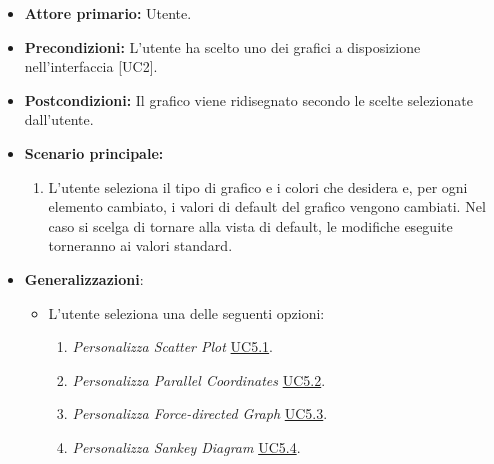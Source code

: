 \begin{itemize}
	\item \textbf{Attore primario:} Utente.
	\item \textbf{Precondizioni:} L'utente ha scelto uno dei grafici a disposizione nell'interfaccia [UC2].
	\item \textbf{Postcondizioni:} Il grafico viene ridisegnato secondo le scelte selezionate dall'utente.
	\item \textbf{Scenario principale:}
	\begin{enumerate}
    		\item L'utente seleziona il tipo di grafico e i colori che desidera e, per ogni elemento cambiato, i valori di default del grafico
    vengono cambiati. Nel caso si scelga di tornare alla vista di default, le modifiche eseguite torneranno ai valori standard.
    \end{enumerate}
    \item \textbf{Generalizzazioni}:
    \begin{itemize}
        \item L'utente seleziona una delle seguenti opzioni:
                \begin{enumerate}
                    \item \textit{Personalizza Scatter Plot} \hyperref[sec:UC5.1]{UC5.1}.
                    \item \textit{Personalizza Parallel Coordinates} \hyperref[sec:UC5.2]{UC5.2}.
                    \item \textit{Personalizza Force-directed Graph} \hyperref[sec:UC5.3]{UC5.3}.
                    \item \textit{Personalizza Sankey Diagram} \hyperref[sec:UC5.4]{UC5.4}.
                \end{enumerate}
    \end{itemize} 
\end{itemize}

\newpage
